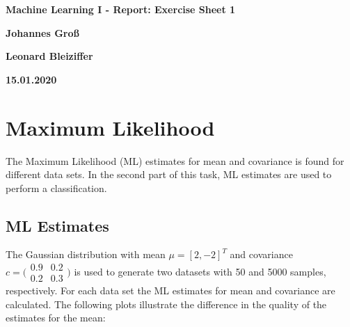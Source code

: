 \documentclass[DIV=12, ngerman, fontsize=12pt, parskip=half]{scrreprt}
\begin{document}
	
	\setcounter{chapter}{1-1}
	
	\begin{center}
		
		\huge
		\textbf{Machine Learning I - Report: Exercise Sheet 1}
		
	\end{center}
	
	
	
	\begin{center}
		\LARGE
		\textbf{Johannes Groß}
		
		\textbf{Leonard Bleiziffer}	
		
	\end{center}
	\vspace{5cm}
	\begin{center}
		\LARGE		
		\textbf{15.01.2020}
		
	\end{center}
	\thispagestyle{empty}
	\thispagestyle{empty}
	
	\vspace{4cm}
	
	{\let\clearpage\relax \chapter{Maximum Likelihood}}
	The Maximum Likelihood (ML) estimates for mean and covariance is found for different data sets. In the second part of this task, ML estimates are used to perform a classification.
	
	\section{ML Estimates}
	The Gaussian distribution with mean $\mu  = [2,-2]^T$ and covariance $c = \big(\begin{smallmatrix}
		0.9 & 0.2\\
		0.2 & 0.3
	\end{smallmatrix}\big)$
	is used to generate two datasets with 50 and 5000 samples, respectively. For each data set the ML estimates for mean and covariance are calculated. The following plots illustrate the difference in the quality of the estimates for the mean:
	
\end{document}
